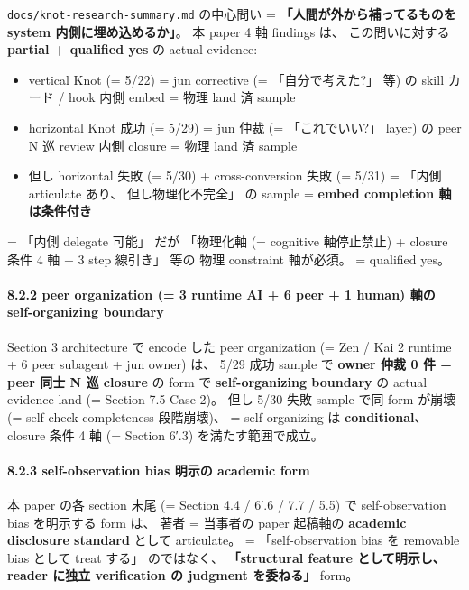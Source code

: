 \documentclass[
]{article}
\providecommand{\tightlist}{%
  \setlength{\itemsep}{0pt}\setlength{\parskip}{0pt}}
\begin{document}
\texttt{docs/knot-research-summary.md} の中心問い =
\textbf{「人間が外から補ってるものを system 内側に埋め込めるか」}。 本
paper 4 軸 findings は、 この問いに対する \textbf{partial + qualified
yes} の actual evidence:

\begin{itemize}
\tightlist
\item
  vertical Knot (= 5/22) = jun corrective (= 「自分で考えた?」 等) の
  skill カード / hook 内側 embed = 物理 land 済 sample
\item
  horizontal Knot 成功 (= 5/29) = jun 仲裁 (= 「これでいい?」 layer) の
  peer N 巡 review 内側 closure = 物理 land 済 sample
\item
  但し horizontal 失敗 (= 5/30) + cross-conversion 失敗 (= 5/31) =
  「内側 articulate あり、 但し物理化不完全」 の sample = \textbf{embed
  completion 軸は条件付き}
\end{itemize}

= 「内側 delegate 可能」 だが 「物理化軸 (= cognitive 軸停止禁止) +
closure 条件 4 軸 + 3 step 線引き」 等の 物理 constraint 軸が必須。 =
qualified yes。

\paragraph{8.2.2 peer organization (= 3 runtime AI + 6 peer + 1 human)
軸の self-organizing
boundary}\label{peer-organization-3-runtime-ai-6-peer-1-human-ux8ef8ux306e-self-organizing-boundary}

Section 3 architecture で encode した peer organization (= Zen / Kai 2
runtime + 6 peer subagent + jun owner) は、 5/29 成功 sample で
\textbf{owner 仲裁 0 件 + peer 同士 N 巡 closure} の form で
\textbf{self-organizing boundary} の actual evidence land (= Section 7.5
Case 2)。 但し 5/30 失敗 sample で同 form が崩壊 (= self-check
completeness 段階崩壊)、 = self-organizing は \textbf{conditional}、
closure 条件 4 軸 (= Section 6′.3) を満たす範囲で成立。

\paragraph{8.2.3 self-observation bias 明示の academic
form}\label{self-observation-bias-ux660eux793aux306e-academic-form}

本 paper の各 section 末尾 (= Section 4.4 / 6′.6 / 7.7 / 5.5) で
self-observation bias を明示する form は、 著者 = 当事者の paper
起稿軸の \textbf{academic disclosure standard} として articulate。 =
「self-observation bias を removable bias として treat する」
のではなく、 \textbf{「structural feature として明示し、 reader に独立
verification の judgment を委ねる」} form。
\end{document}
